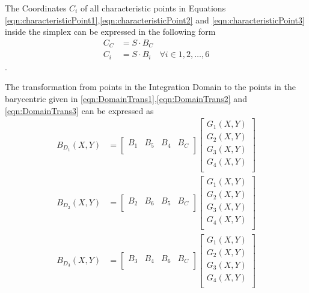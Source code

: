 \documentclass{mitschrift}
\begin{document}
The Coordinates $C_{i}$ of all characteristic points in Equations \eqref{eqn:characteristicPoint1},\eqref{eqn:characteristicPoint2} and \eqref{eqn:characteristicPoint3} inside the simplex can be expressed in the following form \begin{align}
    C_{C} &= S \cdot B_{C} \label{eqn:Trans1}\\
    C_{i} &= S \cdot B_{i} \quad \forall i \in 1,2,\ldots,6 \label{eqn:Trans2}
\end{align}.

The transformation from points in the Integration Domain to the points in the barycentric given in \eqref{eqn:DomainTrans1},\eqref{eqn:DomainTrans2} and \eqref{eqn:DomainTrans3} can be expressed as \begin{align}
    B_{D_1}(X,Y) &=\begin{bmatrix}
        B_1 & B_5 & B_4 & B_C \\ 
    \end{bmatrix} \begin{bmatrix}
        G_1(X,Y) \\
        G_2(X,Y) \\
        G_3(X,Y) \\
        G_4(X,Y) \\
    \end{bmatrix} \\
    B_{D_2}(X,Y) &=\begin{bmatrix}
        B_2 & B_6 & B_5 & B_C \\ 
    \end{bmatrix} \begin{bmatrix}
        G_1(X,Y) \\
        G_2(X,Y) \\
        G_3(X,Y) \\
        G_4(X,Y) \\
    \end{bmatrix} \\
    B_{D_3}(X,Y) &=\begin{bmatrix}
        B_3 & B_4 & B_6 & B_C \\ 
    \end{bmatrix} \begin{bmatrix}
        G_1(X,Y) \\
        G_2(X,Y) \\
        G_3(X,Y) \\
        G_4(X,Y) \\
    \end{bmatrix}
\end{align} 
\end{document}
